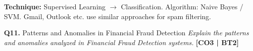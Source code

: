 \documentclass[12pt,a4paper]{article}
\newcommand{\Qno}[1]{\textbf{\color{darkred}Q#1.}}
\begin{document}
\begin{answerenv}
\begin{keypoint}
\textbf{Technique:} Supervised Learning $\to$ Classification. Algorithm: Naive Bayes / SVM. Gmail, Outlook etc. use similar approaches for spam filtering.
\end{keypoint}

\end{answerenv}

\vspace{8pt}

\begin{questionbox}{\Qno{11} Patterns and Anomalies in Financial Fraud Detection}
\textit{Explain the patterns and anomalies analyzed in Financial Fraud Detection systems.} \hfill \textbf{[CO3 | BT2]}
\end{questionbox}
\end{document}
